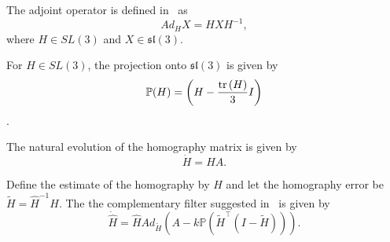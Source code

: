 The adjoint operator is defined in~\cite{MahonyHamelMorinMalis12} as
\[
Ad_HX = HXH^{-1},
\]
where $H\in SL(3)$ and $X\in\mathfrak{sl}(3)$. 

For $H\in SL(3)$, the projection onto $\mathfrak{sl}(3)$ is given by
\[
\mathbb{P}(H)=\left(H-\frac{\text{tr}\left(H\right)}{3}I\right)
\].

The natural evolution of the homography matrix is given by
\[
\dot{H} = HA.
\]

Define the estimate of the homography by $\hat{H}$ and let the homography error be $\tilde{H}=\hat{H}^{-1}H$.  The the complementary filter suggested in~\cite{MahonyHamelMorinMalis12} is given by
\begin{equation}\label{eq:homography_filter}
\dot{\hat{H}} = \hat{H} Ad_{\tilde{H}}\left(A-k\mathbb{P}(\tilde{H}^{\top}(I-\tilde{H}))\right).
\end{equation}


